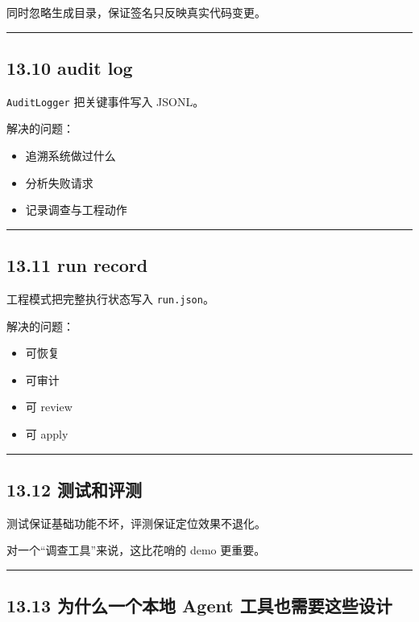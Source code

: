 \documentclass[UTF8,12pt,openany]{ctexbook}
\begin{document}
同时忽略生成目录，保证签名只反映真实代码变更。\par

\hrule

\subsection{13.10 audit log}

\texttt{AuditLogger} 把关键事件写入 JSONL。\par

解决的问题：\par

\begin{itemize}
\item 追溯系统做过什么
\item 分析失败请求
\item 记录调查与工程动作
\end{itemize}

\hrule

\subsection{13.11 run record}

工程模式把完整执行状态写入 \texttt{run.json}。\par

解决的问题：\par

\begin{itemize}
\item 可恢复
\item 可审计
\item 可 review
\item 可 apply
\end{itemize}

\hrule

\subsection{13.12 测试和评测}

测试保证基础功能不坏，评测保证定位效果不退化。  \par
对一个“调查工具”来说，这比花哨的 demo 更重要。\par

\hrule

\subsection{13.13 为什么一个本地 Agent 工具也需要这些设计}
\end{document}
